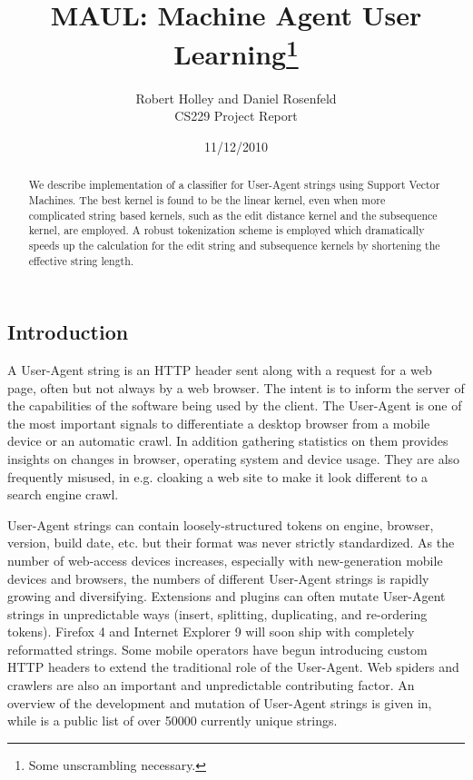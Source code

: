 \documentclass[10pt]{article}
\title{MAUL: Machine Agent User Learning\footnote{Some unscrambling necessary.} }
\author{Robert Holley and Daniel Rosenfeld \\ CS229 Project Report}
\date{11/12/2010}
\begin{document}
\maketitle
\begin{abstract}
We describe implementation of a classifier for User-Agent strings using Support Vector Machines.  The best kernel is found to be the linear kernel, even when more complicated string based kernels, such as the edit distance kernel and the subsequence kernel, are employed.  A robust tokenization scheme is employed which dramatically speeds up the calculation for the edit string and subsequence kernels by shortening the effective string length. 
\end{abstract}
\begin{multicols}{2}

\section{Introduction}
A User-Agent string is an HTTP header sent along with a request for a web page, often but not always by a web browser.\cite{httprfc} The intent is to inform the server
of the capabilities of the software being used by the client. The User-Agent is
one of the most important signals to differentiate a desktop browser from a
mobile device or an automatic crawl. In addition gathering statistics on them
provides insights on changes in browser, operating system and device usage. They
are also frequently misused, in e.g. cloaking a web site to make it look
different to a search engine crawl.

User-Agent strings can contain loosely-structured tokens on engine, browser,
version, build date, etc. but their format was never strictly standardized.\cite{httprfc}
As the number of web-access devices increases, especially with new-generation
mobile devices and browsers, the numbers of different User-Agent strings is
rapidly growing and diversifying. Extensions and plugins can often mutate
User-Agent strings in unpredictable ways (insert, splitting, duplicating, and
re-ordering tokens). Firefox 4 and Internet Explorer 9 will soon ship with
completely reformatted strings. Some mobile operators have begun introducing
custom HTTP headers to extend the traditional role of the User-Agent.\cite{mobile} Web spiders and crawlers are also an important and unpredictable contributing factor.
An overview of the development and mutation of User-Agent strings is given in,\cite{history} while \cite{uatracker} is a public list of over 50000 currently unique strings.


\end{multicols}
\end{document}
